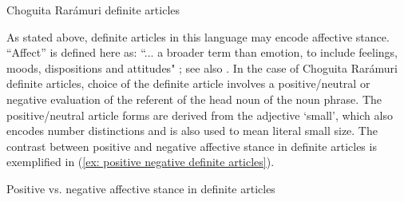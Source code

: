 \ea\label{ex: articles}
{Choguita Rarámuri definite articles}

    \z
\z

As stated above, definite articles in this language may encode affective stance. ``Affect'' is defined here as: ``... a broader term than emotion, to include feelings, moods, dispositions and attitudes" \citep[7]{ochs1989language}; see also \citet{neely2019linguistic}. In the case of Choguita Rarámuri definite articles, choice of the definite article involves a positive/neutral or negative evaluation of the referent of the head noun of the noun phrase. The positive/neutral article forms are derived from the adjective `small', which also encodes number distinctions and is also used to mean literal small size. The contrast between positive and negative affective stance in definite articles is exemplified in (\ref{ex: positive negative definite articles}).


\ea\label{ex: positive negative definite articles}
{Positive vs. negative affective stance in definite articles}

    \label{ex: positive negative definite articlesa}
        \label{ex: positive negative definite articlesb}
    \z
\z

